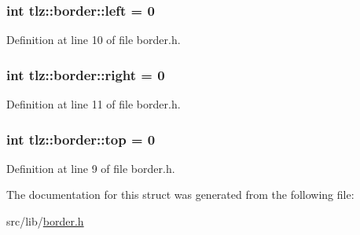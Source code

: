 \subsubsection[{\texorpdfstring{left}{left}}]{\setlength{\rightskip}{0pt plus 5cm}int tlz\+::border\+::left = 0}\hypertarget{structtlz_1_1border_a5734cf1a283c5516df752a316dd19de4}{}\label{structtlz_1_1border_a5734cf1a283c5516df752a316dd19de4}


Definition at line 10 of file border.\+h.

\subsubsection[{\texorpdfstring{right}{right}}]{\setlength{\rightskip}{0pt plus 5cm}int tlz\+::border\+::right = 0}\hypertarget{structtlz_1_1border_ab5c0eb6a2c7b29c0da551d320511a7f1}{}\label{structtlz_1_1border_ab5c0eb6a2c7b29c0da551d320511a7f1}


Definition at line 11 of file border.\+h.

\subsubsection[{\texorpdfstring{top}{top}}]{\setlength{\rightskip}{0pt plus 5cm}int tlz\+::border\+::top = 0}\hypertarget{structtlz_1_1border_aa6ca12a38179255b45cfedd33fae3ad2}{}\label{structtlz_1_1border_aa6ca12a38179255b45cfedd33fae3ad2}


Definition at line 9 of file border.\+h.



The documentation for this struct was generated from the following file\+:\begin{DoxyCompactItemize}
\item 
src/lib/\hyperlink{border_8h}{border.\+h}\end{DoxyCompactItemize}
